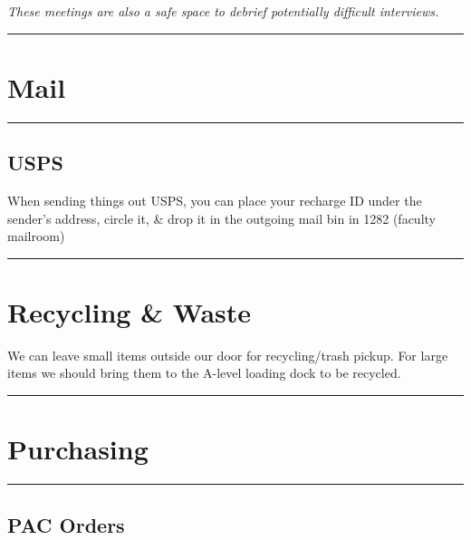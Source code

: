 \documentclass[]{book}
\begin{document}
\emph{These meetings are also a safe space to debrief potentially difficult interviews.}

\begin{center}\rule{0.5\linewidth}{\linethickness}\end{center}

\hypertarget{mail}{%
\section{Mail}\label{mail}}

\begin{center}\rule{0.5\linewidth}{\linethickness}\end{center}

\hypertarget{usps}{%
\subsection{USPS}\label{usps}}

When sending things out USPS, you can place your recharge ID under the sender's address, circle it, \& drop it in the outgoing mail bin in 1282 (faculty mailroom)

\begin{center}\rule{0.5\linewidth}{\linethickness}\end{center}

\hypertarget{recycling-waste}{%
\section{Recycling \& Waste}\label{recycling-waste}}

We can leave small items outside our door for recycling/trash pickup. For large items we should bring them to the A-level loading dock to be recycled.

\begin{center}\rule{0.5\linewidth}{\linethickness}\end{center}

\hypertarget{purchasing}{%
\section{Purchasing}\label{purchasing}}

\begin{center}\rule{0.5\linewidth}{\linethickness}\end{center}

\hypertarget{pac-orders}{%
\subsection{PAC Orders}\label{pac-orders}}
\end{document}
